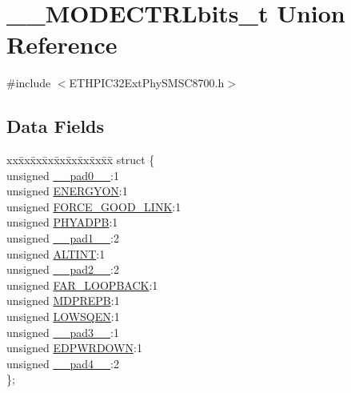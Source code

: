\hypertarget{union_____m_o_d_e_c_t_r_lbits__t}{}\section{\+\_\+\+\_\+\+M\+O\+D\+E\+C\+T\+R\+Lbits\+\_\+t Union Reference}
\label{union_____m_o_d_e_c_t_r_lbits__t}


{\ttfamily \#include $<$E\+T\+H\+P\+I\+C32\+Ext\+Phy\+S\+M\+S\+C8700.\+h$>$}

\subsection*{Data Fields}
\begin{DoxyCompactItemize}
\item 
\begin{tabbing}
xx\=xx\=xx\=xx\=xx\=xx\=xx\=xx\=xx\=\kill
struct \{\\
\>unsigned \hyperlink{union_____m_o_d_e_c_t_r_lbits__t_adf71f3d8410c1f1dbbc96680a92c49af}{\_\_pad0\_\_}:1\\
\>unsigned \hyperlink{union_____m_o_d_e_c_t_r_lbits__t_a0e6638c4dcc6fef3510e0b521a1aa8c8}{ENERGYON}:1\\
\>unsigned \hyperlink{union_____m_o_d_e_c_t_r_lbits__t_a8b1feca91c14a38a480aaba4464edbfd}{FORCE\_GOOD\_LINK}:1\\
\>unsigned \hyperlink{union_____m_o_d_e_c_t_r_lbits__t_a8644ccd88805f81a4ec242b9f3e524bd}{PHYADPB}:1\\
\>unsigned \hyperlink{union_____m_o_d_e_c_t_r_lbits__t_acaf2d0924a107ec6e8d2e31febaf66f9}{\_\_pad1\_\_}:2\\
\>unsigned \hyperlink{union_____m_o_d_e_c_t_r_lbits__t_a02caa18a58089bd11c8b233ff2a91441}{ALTINT}:1\\
\>unsigned \hyperlink{union_____m_o_d_e_c_t_r_lbits__t_a4d97cc5f7d51d22fc2bf3eab35c9cb7f}{\_\_pad2\_\_}:2\\
\>unsigned \hyperlink{union_____m_o_d_e_c_t_r_lbits__t_a7ece9ee327c35fb16496bda663df62ed}{FAR\_LOOPBACK}:1\\
\>unsigned \hyperlink{union_____m_o_d_e_c_t_r_lbits__t_a0f99db507a54f121a74b8afda9e5d8ee}{MDPREPB}:1\\
\>unsigned \hyperlink{union_____m_o_d_e_c_t_r_lbits__t_a0064e0339cb441584d5959d2d7b71cc9}{LOWSQEN}:1\\
\>unsigned \hyperlink{union_____m_o_d_e_c_t_r_lbits__t_ad7d7cee33e0c7f447abc4d171c628dd4}{\_\_pad3\_\_}:1\\
\>unsigned \hyperlink{union_____m_o_d_e_c_t_r_lbits__t_a28425f5c6c61ecfcf884f230ffe37bf0}{EDPWRDOWN}:1\\
\>unsigned \hyperlink{union_____m_o_d_e_c_t_r_lbits__t_a8d1e932de3f1bdec682271c90f2ca15c}{\_\_pad4\_\_}:2\\
\}; \\


\end{tabbing}
\end{DoxyCompactItemize}

